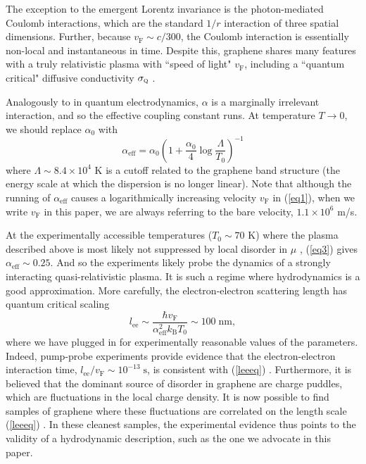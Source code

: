 \documentclass[10pt, oneside]{book}
\begin{document}
\begin{doublespace}
The exception to the emergent Lorentz invariance is the photon-mediated Coulomb interactions, which are the standard $1/r$ interaction of three spatial dimensions.   Further, because $v_{\mathrm{F}} \sim c/300$,  the Coulomb interaction is essentially non-local and instantaneous in time.   Despite this,  graphene shares many features with a truly relativistic plasma with ``speed of light" $v_{\mathrm{F}}$, including a ``quantum critical" diffusive conductivity $\sigma_{\textsc{q}}$ \cite{muller2}.

Analogously to in quantum electrodynamics, $\alpha$ is a marginally irrelevant interaction, and so the effective coupling constant runs.   At temperature $T\rightarrow 0$, we should replace $\alpha_0$ with \cite{schmalian} \begin{equation}
\alpha_{\mathrm{eff}} = \alpha_0 \left(1+\frac{\alpha_0}{4}\log\frac{\Lambda}{T_0}\right)^{-1} \label{eq3}
\end{equation}
where $\Lambda \sim 8.4\times 10^4$ K is a cutoff related to the graphene band structure (the energy scale at which the dispersion is no longer linear).  Note that although the running of $\alpha_{\mathrm{eff}}$ causes a logarithmically increasing velocity $v_{\mathrm{F}}$ in (\ref{eq1}), when we write $v_{\mathrm{F}}$ in this paper, we are always referring to the bare velocity, $1.1\times 10^6$ m/s.    

At the experimentally accessible temperatures ($T_0\sim 70$ K) where the plasma described above is most likely not suppressed by local disorder in $\mu$ \cite{Crossno1058},  (\ref{eq3}) gives $\alpha_{\mathrm{eff}} \sim 0.25$.    And so the experiments likely probe the dynamics of a strongly interacting quasi-relativistic plasma.   It is such a regime where hydrodynamics is a good approximation.   More carefully, the electron-electron scattering length has quantum critical scaling \cite{muller2} \begin{equation}
l_{\mathrm{ee}} \sim \frac{\hbar v_{\mathrm{F}}}{\alpha_{\mathrm{eff}}^2 k_{\mathrm{B}}T_0} \sim 100 \; \mathrm{nm},  \label{leeeq}
\end{equation}
where we have plugged in for experimentally reasonable values of the parameters.   Indeed, pump-probe experiments provide evidence that the electron-electron interaction time,  $l_{\mathrm{ee}}/v_{\mathrm{F}} \sim 10^{-13} \; \mathrm{s}$, is consistent with (\ref{leeeq}) \cite{breusing, johannsen}.   Furthermore, it is believed that the dominant source of disorder in graphene are charge puddles, which are fluctuations in the local charge density.   It is now possible to find samples of graphene where these fluctuations are correlated on the length scale (\ref{leeeq}) \cite{xue}.   In these cleanest samples, the experimental evidence thus points to the validity of a hydrodynamic description, such as the one we advocate in this paper.



\end{doublespace}
\end{document}
